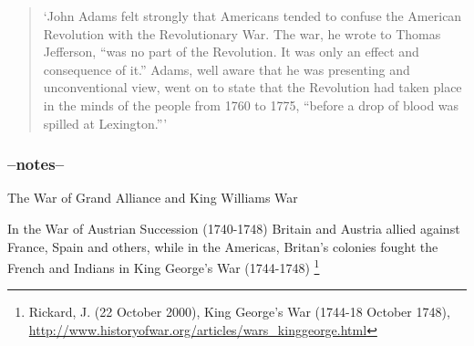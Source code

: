 \begin{quote}
  `John Adams felt strongly that Americans tended to confuse the American 
  Revolution with the Revolutionary War. The war, he wrote to Thomas Jefferson,
  ``was no part of the Revolution. It was only an effect and consequence of it.''
  Adams, well aware that he was presenting and unconventional view, went on to
  state that the Revolution had taken place in the minds of the people from 1760
  to 1775, ``before a drop of blood was spilled at
  Lexington.'''\cite[15]{dupuy_1977}
\end{quote}



\subsubsection{--notes--}



The War of Grand Alliance and King Williams War 

In the War of Austrian Succession (1740-1748) Britain and Austria allied against
France, Spain and others, while in the Americas, Britan's colonies fought the
French and Indians in King George's War (1744-1748) \footnote{Rickard, J. (22
October 2000), King George's War (1744-18 October 1748),
\url{http://www.historyofwar.org/articles/wars_kinggeorge.html}}


\begin{quotation}\end{quotation}

\begin{quotation}\end{quotation}

